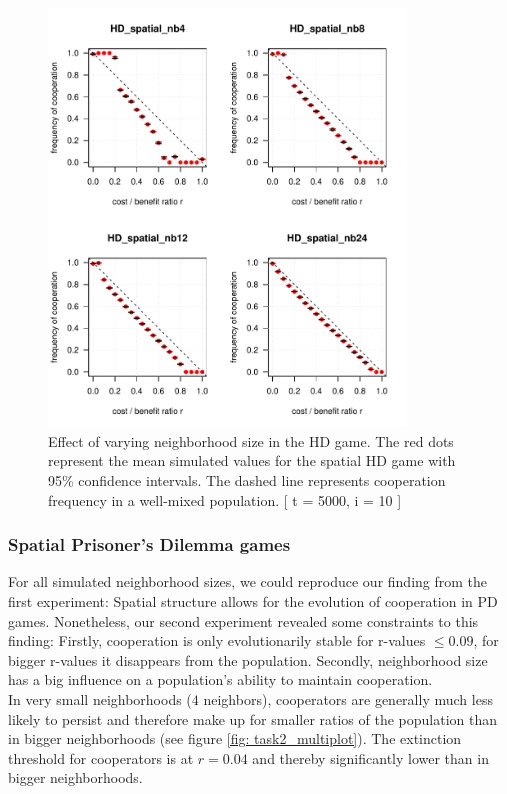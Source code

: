 \begin{figure}[H]
	\centering 
	\includegraphics[width=9.5cm]{task2_4plot}
	\caption{Effect of varying neighborhood size in the HD game. The red dots represent the mean simulated values for the spatial HD game with 95\% confidence intervals. The dashed line represents cooperation frequency in a well-mixed population. [ t = 5000, i = 10 ] }\label{fig: task2_4plot}
\end{figure}



\subsubsection*{Spatial Prisoner's Dilemma games}
For all simulated neighborhood sizes, we could reproduce our finding from the first experiment: Spatial structure allows for the evolution of cooperation in PD games. Nonetheless, our second experiment revealed some constraints to this finding: Firstly, cooperation is only evolutionarily stable for r-values $ \leq 0.09$, for bigger r-values it disappears from the population. Secondly, neighborhood size has a big influence on a population's ability to maintain cooperation.\\
In very small neighborhoods ($4$ neighbors), cooperators are generally much less likely to persist and therefore make up for smaller ratios of the population than in bigger neighborhoods (see figure \ref{fig: task2_multiplot}). The extinction threshold for cooperators is at $r=0.04$ and thereby significantly lower than in bigger neighborhoods. 


